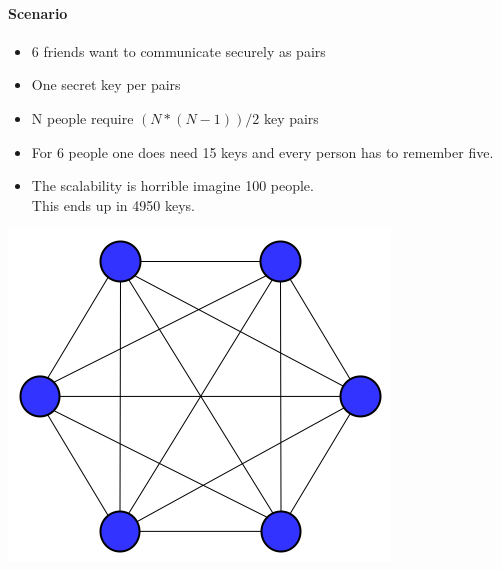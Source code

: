 \paragraph{Scenario}
\begin{minipage}{0.8\linewidth}
  \begin{itemize}
    \item 6 friends want to communicate securely as pairs
    \item One secret key per pairs
    \item N people require \( (N * (N-1)) / 2 \) key pairs
    \item For 6 people one does need 15 keys and every person has to remember five.
    \item The scalability is horrible imagine 100 people. \\This ends up in 4950 keys.
  \end{itemize}
\end{minipage}
\begin{minipage}{0.2\linewidth}
  \includegraphics[width=\linewidth]{images/EmbeddedSecurity/KeyExchange.png}
\end{minipage}
